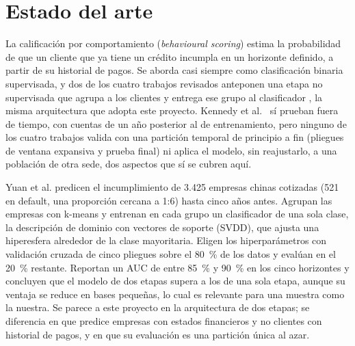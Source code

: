 \documentclass[journal]{IEEEtran}
\begin{document}
\section{Estado del arte}

La calificación por comportamiento (\emph{behavioural scoring}) estima la probabilidad de que un cliente que ya tiene un crédito incumpla en un horizonte definido, a partir de su historial de pagos. Se aborda casi siempre como clasificación binaria supervisada, y dos de los cuatro trabajos revisados anteponen una etapa no supervisada que agrupa a los clientes y entrega ese grupo al clasificador \cite{yuan2022,bakoben2020}, la misma arquitectura que adopta este proyecto. Kennedy et al.~\cite{kennedy2013} sí prueban fuera de tiempo, con cuentas de un año posterior al de entrenamiento, pero ninguno de los cuatro trabajos valida con una partición temporal de principio a fin (pliegues de ventana expansiva y prueba final) ni aplica el modelo, sin reajustarlo, a una población de otra sede, dos aspectos que sí se cubren aquí.

Yuan et al. \cite{yuan2022} predicen el incumplimiento de 3.425 empresas chinas cotizadas (521 en default, una proporción cercana a 1:6) hasta cinco años antes. Agrupan las empresas con k-means y entrenan en cada grupo un clasificador de una sola clase, la descripción de dominio con vectores de soporte (SVDD), que ajusta una hiperesfera alrededor de la clase mayoritaria. Eligen los hiperparámetros con validación cruzada de cinco pliegues sobre el 80~\% de los datos y evalúan en el 20~\% restante. Reportan un AUC de entre 85~\% y 90~\% en los cinco horizontes y concluyen que el modelo de dos etapas supera a los de una sola etapa, aunque su ventaja se reduce en bases pequeñas, lo cual es relevante para una muestra como la nuestra. Se parece a este proyecto en la arquitectura de dos etapas; se diferencia en que predice empresas con estados financieros y no clientes con historial de pagos, y en que su evaluación es una partición única al azar.
\end{document}

